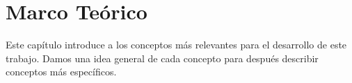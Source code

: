 
\chapter{Marco Teórico}

Este capítulo introduce a los conceptos más relevantes para el desarrollo de este trabajo. Damos una idea general de cada concepto para después describir conceptos más específicos.






